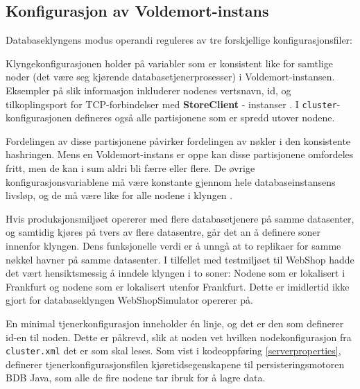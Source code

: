\subsection{Konfigurasjon av Voldemort-instans}

Databaseklyngens modus operandi reguleres av tre forskjellige konfigurasjonsfiler:



Klyngekonfigurasjonen holder på variabler som er konsistent like for samtlige noder (det være seg kjørende database\-tjener\-prosesser) i Voldemort-instansen. Eksempler på slik informasjon inkluderer nodenes vertsnavn, id, og tilkoplingsport for TCP-forbindelser med \textbf{StoreClient} - instanser \citep{kreps2009}. I \texttt{cluster}-konfigurasjonen defineres også alle partisjonene som er spredd utover nodene.

Fordelingen av disse partisjonene påvirker fordelingen av nøkler i den konsistente hashringen. Mens en Voldemort-instans er oppe kan disse partisjonene omfordeles fritt, men de kan i sum aldri bli færre eller flere. De øvrige konfigurasjonsvariablene må være konstante gjennom hele databaseinstansens livsløp, og de må være like for alle nodene i klyngen \citep{kreps2009}.

Hvis produksjonsmiljøet opererer med flere databasetjenere på samme datasenter, og samtidig kjøres på tvers av flere datasentre, går det an å definere soner innenfor klyngen. Dens funksjonelle verdi er å unngå at to replikaer for samme nøkkel havner på samme datasenter. I tilfellet med testmiljøet til WebShop hadde det vært hensiktsmessig å inndele klyngen i to soner: Nodene som er lokalisert i Frankfurt og nodene som er lokalisert utenfor Frankfurt. Dette er imidlertid ikke gjort for databaseklyngen WebShopSimulator opererer på.



En minimal tjenerkonfigurasjon inneholder én linje, og det er den som definerer id-en til noden. Dette er påkrevd, slik at noden vet hvilken nodekonfigurasjon fra \texttt{cluster.xml} det er som skal leses. Som vist i kodeoppføring \ref{serverproperties}, definerer tjener\-konfigurasjons\-filen kjøretidsegenskapene til persisterings\-motoren BDB Java, som alle de fire nodene tar ibruk for å lagre data.

